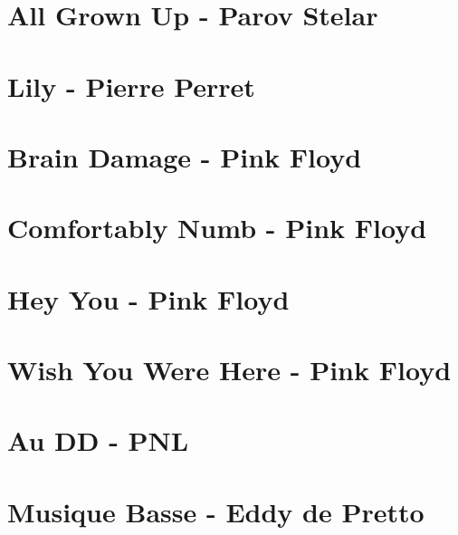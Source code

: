 \documentclass[11pt]{article}
\begin{document}
\section{All Grown Up - Parov Stelar}
\begin{guitar}

\end{guitar}


\section{Lily - Pierre Perret}


\section*{Brain Damage - Pink Floyd}
\begin{guitar}

\end{guitar}


\section{Comfortably Numb - Pink Floyd}
\begin{guitar}

\end{guitar}


\section{Hey You - Pink Floyd}





\section{Wish You Were Here - Pink Floyd}
\begin{guitar}

\end{guitar}


\section{Au DD - PNL}




\section{Musique Basse - Eddy de Pretto}
\begin{guitar}

\end{guitar}
\end{document}

